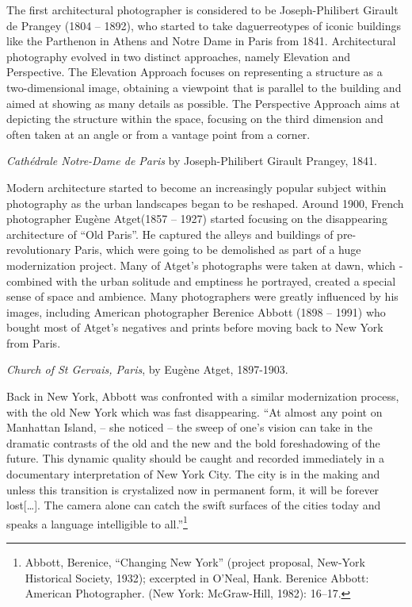\documentclass[
  openany]{book}
\begin{document}
The first architectural photographer is considered to be Joseph-Philibert Girault de Prangey (1804 -- 1892), who started to take daguerreotypes of iconic buildings like the Parthenon in Athens and Notre Dame in Paris from 1841. Architectural photography evolved in two distinct approaches, namely Elevation and Perspective. The Elevation Approach focuses on representing a structure as a two-dimensional image, obtaining a viewpoint that is parallel to the building and aimed at showing as many details as possible. The Perspective Approach aims at depicting the structure within the space, focusing on the third dimension and often taken at an angle or from a vantage point from a corner.

\emph{Cathédrale Notre-Dame de Paris} by Joseph-Philibert Girault Prangey, 1841.

Modern architecture started to become an increasingly popular subject within photography as the urban landscapes began to be reshaped. Around 1900, French photographer Eugène Atget(1857 -- 1927) started focusing on the disappearing architecture of ``Old Paris''. He captured the alleys and buildings of pre-revolutionary Paris, which were going to be demolished as part of a huge modernization project.
Many of Atget's photographs were taken at dawn, which - combined with the urban solitude and emptiness he portrayed, created a special sense of space and ambience. Many photographers were greatly influenced by his images, including American photographer Berenice Abbott (1898 -- 1991) who bought most of Atget's negatives and prints before moving back to New York from Paris.

\emph{Church of St Gervais, Paris}, by Eugène Atget, 1897-1903.

Back in New York, Abbott was confronted with a similar modernization process, with the old New York which was fast disappearing. ``At almost any point on Manhattan Island, -- she noticed -- the sweep of one's vision can take in the dramatic contrasts of the old and the new and the bold foreshadowing of the future. This dynamic quality should be caught and recorded immediately in a documentary interpretation of New York City. The city is in the making and unless this transition is crystalized now in permanent form, it will be forever lost{[}\ldots{]}. The camera alone can catch the swift surfaces of the cities today and speaks a language intelligible to all.''\footnote{Abbott, Berenice, ``Changing New York'' (project proposal, New-York Historical Society, 1932); excerpted in O'Neal, Hank. Berenice Abbott: American Photographer. (New York: McGraw-Hill, 1982): 16--17.}
\end{document}
